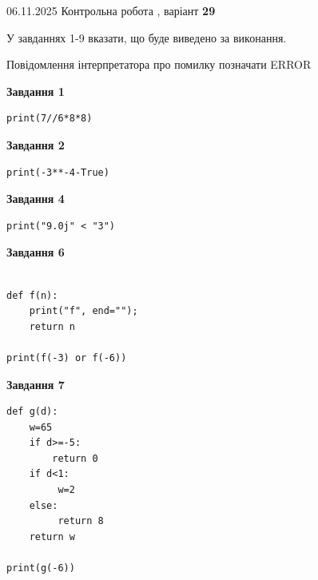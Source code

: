\documentclass[12pt, ukrainian]{article}
\begin{document}
{\Large{06.11.2025 Контрольна робота , варіант  \No \textbf { 29 }\par}}
{
\begin {large}
У завданнях 1-9 вказати, що буде виведено за виконання.

Повідомлення інтерпретатора про помилку позначати ERROR

\begin{minipage}[t]{7.5cm}

\begin{center}
\textbf{Завдання 1}
\end{center}

\begin{verbatim}
print(7//6*8*8)
\end{verbatim}



\begin{center}
\textbf{Завдання 2}
\end{center}

\begin{verbatim}
print(-3**-4-True)
\end{verbatim}



\begin{center}
\textbf{Завдання 4}
\end{center}

\begin{verbatim}
print("9.0j" < "3")
\end{verbatim}



\begin{center}
\textbf{Завдання 6}
\end{center}

\begin{verbatim}

def f(n):
    print("f", end="");
    return n

print(f(-3) or f(-6))
\end{verbatim}



\begin{center}
\textbf{Завдання 7}
\end{center}

\begin{verbatim}
def g(d):
    w=65
    if d>=-5: 
        return 0
    if d<1:
         w=2
    else:
         return 8
    return w

print(g(-6))
\end{verbatim}


\end{minipage}
\end{large}}
\end{document}
